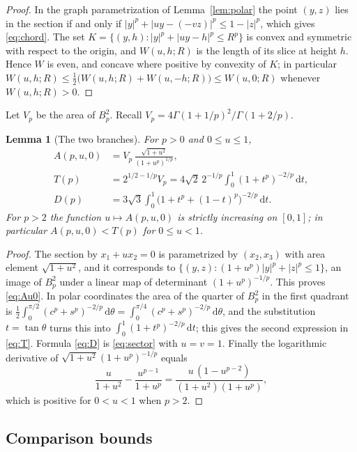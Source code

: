 \documentclass[11pt]{amsart}
\newtheorem{lemma}[theorem]{Lemma}
\theoremstyle{definition}
\theoremstyle{remark}
\numberwithin{equation}{section}
\newcommand{\dd}{\,\mathrm{d}}
\begin{document}
\begin{proof}
In the graph parametrization of Lemma~\ref{lem:polar} the point $(y,z)$ lies in the section if and only if $|y|^p+|uy-(-vz)|^p\le 1-|z|^p$, which gives \eqref{eq:chord}. The set $K=\{(y,h):|y|^p+|uy-h|^p\le R^p\}$ is convex and symmetric with respect to the origin, and $W(u,h;R)$ is the length of its slice at height $h$. Hence $W$ is even, and concave where positive by convexity of $K$; in particular $W(u,h;R)\le\tfrac12\bigl(W(u,h;R)+W(u,-h;R)\bigr)\le W(u,0;R)$ whenever $W(u,h;R)>0$.
\end{proof}

Let $V_p$ be the area of $B_p^2$. Recall $V_p=4\Gamma(1+1/p)^2/\Gamma(1+2/p)$.

\begin{lemma}[The two branches]\label{lem:branches}
For $p>0$ and $0\le u\le1$,
\begin{align}
A(p,u,0)&=V_p\,\frac{\sqrt{1+u^2}}{(1+u^p)^{1/p}},\label{eq:Au0}\\
T(p)&=2^{1/2-1/p}V_p=4\sqrt2\,2^{-1/p}\int_0^1(1+t^p)^{-2/p}\dd t,\label{eq:T}\\
D(p)&=3\sqrt3\int_0^1\bigl(1+t^p+(1-t)^p\bigr)^{-2/p}\dd t.\label{eq:D}
\end{align}
For $p>2$ the function $u\mapsto A(p,u,0)$ is strictly increasing on $[0,1]$; in particular $A(p,u,0)<T(p)$ for $0\le u<1$.
\end{lemma}

\begin{proof}
The section by $x_1+ux_2=0$ is parametrized by $(x_2,x_3)$ with area element $\sqrt{1+u^2}$, and it corresponds to $\{(y,z):(1+u^p)|y|^p+|z|^p\le1\}$, an image of $B_p^2$ under a linear map of determinant $(1+u^p)^{-1/p}$. This proves \eqref{eq:Au0}. In polar coordinates the area of the quarter of $B_p^2$ in the first quadrant is $\frac12\int_0^{\pi/2}(c^p+s^p)^{-2/p}\dd\theta=\int_0^{\pi/4}(c^p+s^p)^{-2/p}\dd\theta$, and the substitution $t=\tan\theta$ turns this into $\int_0^1(1+t^p)^{-2/p}\dd t$; this gives the second expression in \eqref{eq:T}. Formula \eqref{eq:D} is \eqref{eq:sector} with $u=v=1$. Finally the logarithmic derivative of $\sqrt{1+u^2}(1+u^p)^{-1/p}$ equals
\[
\frac{u}{1+u^2}-\frac{u^{p-1}}{1+u^p}=\frac{u\,(1-u^{p-2})}{(1+u^2)(1+u^p)},
\]
which is positive for $0<u<1$ when $p>2$.
\end{proof}

\subsection{Comparison bounds}
\end{document}
